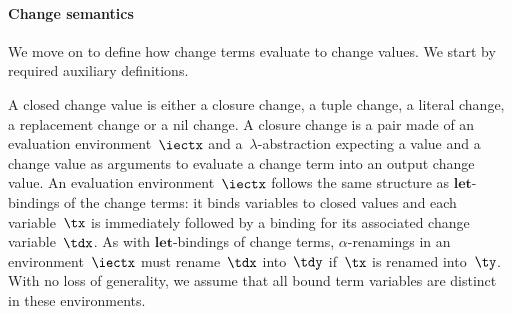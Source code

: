 \paragraph{Change semantics} We move on to define how change terms evaluate to
change values. We start by required auxiliary definitions.

A closed change value is either a closure change, a tuple change,
a literal change, a replacement change or a nil change.
%
A closure change is a pair made of an evaluation environment~$\iectx$
and a~$\lambda$-abstraction expecting a value and a change value as
arguments to evaluate a change term into an output change value. An
evaluation environment~$\iectx$ follows the same structure as
$\textbf{let}$-bindings of the change terms: it binds variables to
closed values and each variable~$\tx$ is immediately followed by a
binding for its associated change variable~$\tdx$. As with
$\textbf{let}$-bindings of change terms, $\alpha$-renamings in an
environment~$\iectx$ must rename~$\tdx$ into~$\tdy$ if~$\tx$ is
renamed into~$\ty$. With no loss of generality, we assume that all
bound term variables are distinct in these environments.

